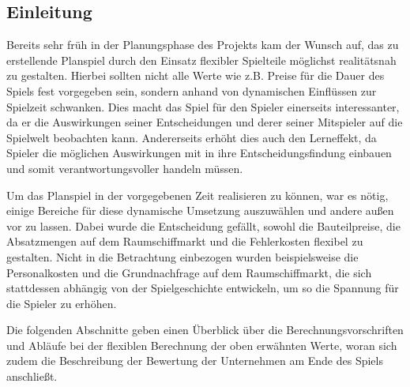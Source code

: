 \subsection{Einleitung}
\label{sub:spielwelt-logik-einleitung}


Bereits sehr früh in der Planungsphase des Projekts kam der Wunsch auf, das zu erstellende Planspiel
durch den Einsatz flexibler Spielteile möglichst realitätsnah zu gestalten. Hierbei sollten nicht
alle Werte wie z.B. Preise für die Dauer des Spiels fest vorgegeben sein, sondern anhand von
dynamischen Einflüssen zur Spielzeit schwanken. Dies macht das Spiel für den Spieler einerseits
interessanter, da er die Auswirkungen seiner Entscheidungen und derer seiner Mitspieler auf die
Spielwelt beobachten kann. Andererseits erhöht dies auch den Lerneffekt, da Spieler die möglichen
Auswirkungen mit in ihre Entscheidungsfindung einbauen und somit verantwortungsvoller handeln
müssen.

Um das Planspiel in der vorgegebenen Zeit realisieren zu können, war es nötig, einige Bereiche für
diese dynamische Umsetzung auszuwählen und andere außen vor zu lassen. Dabei wurde die Entscheidung
gefällt, sowohl die Bauteilpreise, die Absatzmengen auf dem Raumschiffmarkt und die Fehlerkosten
flexibel zu gestalten. Nicht in die Betrachtung einbezogen wurden beispielsweise die Personalkosten
und die Grundnachfrage auf dem Raumschiffmarkt, die sich stattdessen abhängig von der
Spielgeschichte entwickeln, um so die Spannung für die Spieler zu erhöhen.

Die folgenden Abschnitte geben einen Überblick über die Berechnungsvorschriften und Abläufe bei der
flexiblen Berechnung der oben erwähnten Werte, woran sich zudem die Beschreibung der Bewertung der
Unternehmen am Ende des Spiels anschließt.


